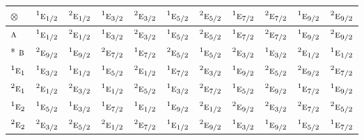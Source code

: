 \documentclass[10pt,a4paper]{article}
\numberwithin{equation}{section}
\newcommand{\irr}[1]{\text{\normalfont\scshape #1}}
\newcommand{\conjpair}[1]{{}^{#1}}
\newcommand{\irrprod}{\otimes}
\begin{document}
{\small\setlength{\tabcolsep}{3pt}\begin{longtable}{@{}lcccccccccc@{}}\toprule
$\irrprod$ & $\conjpair{1}\irr{e}_{1/2}$ & $\conjpair{2}\irr{e}_{1/2}$ & $\conjpair{1}\irr{e}_{3/2}$ & $\conjpair{2}\irr{e}_{3/2}$ & $\conjpair{1}\irr{e}_{5/2}$ & $\conjpair{2}\irr{e}_{5/2}$ & $\conjpair{1}\irr{e}_{7/2}$ & $\conjpair{2}\irr{e}_{7/2}$ & $\conjpair{1}\irr{e}_{9/2}$ & $\conjpair{2}\irr{e}_{9/2}$\\\midrule\endhead
\bottomrule\endfoot\endlastfoot
$\irr{a}$ & $\conjpair{1}\irr{e}_{1/2}$ & $\conjpair{2}\irr{e}_{1/2}$ & $\conjpair{1}\irr{e}_{3/2}$ & $\conjpair{2}\irr{e}_{3/2}$ & $\conjpair{1}\irr{e}_{5/2}$ & $\conjpair{2}\irr{e}_{5/2}$ & $\conjpair{1}\irr{e}_{7/2}$ & $\conjpair{2}\irr{e}_{7/2}$ & $\conjpair{1}\irr{e}_{9/2}$ & $\conjpair{2}\irr{e}_{9/2}$\\*
$\irr{b}$ & $\conjpair{2}\irr{e}_{9/2}$ & $\conjpair{1}\irr{e}_{9/2}$ & $\conjpair{2}\irr{e}_{7/2}$ & $\conjpair{1}\irr{e}_{7/2}$ & $\conjpair{2}\irr{e}_{5/2}$ & $\conjpair{1}\irr{e}_{5/2}$ & $\conjpair{2}\irr{e}_{3/2}$ & $\conjpair{1}\irr{e}_{3/2}$ & $\conjpair{2}\irr{e}_{1/2}$ & $\conjpair{1}\irr{e}_{1/2}$\\
$\conjpair{1}\irr{e}_{1}$ & $\conjpair{1}\irr{e}_{3/2}$ & $\conjpair{1}\irr{e}_{1/2}$ & $\conjpair{1}\irr{e}_{5/2}$ & $\conjpair{2}\irr{e}_{1/2}$ & $\conjpair{1}\irr{e}_{7/2}$ & $\conjpair{2}\irr{e}_{3/2}$ & $\conjpair{1}\irr{e}_{9/2}$ & $\conjpair{2}\irr{e}_{5/2}$ & $\conjpair{2}\irr{e}_{9/2}$ & $\conjpair{2}\irr{e}_{7/2}$\\
$\conjpair{2}\irr{e}_{1}$ & $\conjpair{2}\irr{e}_{1/2}$ & $\conjpair{2}\irr{e}_{3/2}$ & $\conjpair{1}\irr{e}_{1/2}$ & $\conjpair{2}\irr{e}_{5/2}$ & $\conjpair{1}\irr{e}_{3/2}$ & $\conjpair{2}\irr{e}_{7/2}$ & $\conjpair{1}\irr{e}_{5/2}$ & $\conjpair{2}\irr{e}_{9/2}$ & $\conjpair{1}\irr{e}_{7/2}$ & $\conjpair{1}\irr{e}_{9/2}$\\
$\conjpair{1}\irr{e}_{2}$ & $\conjpair{1}\irr{e}_{5/2}$ & $\conjpair{1}\irr{e}_{3/2}$ & $\conjpair{1}\irr{e}_{7/2}$ & $\conjpair{1}\irr{e}_{1/2}$ & $\conjpair{1}\irr{e}_{9/2}$ & $\conjpair{2}\irr{e}_{1/2}$ & $\conjpair{2}\irr{e}_{9/2}$ & $\conjpair{2}\irr{e}_{3/2}$ & $\conjpair{2}\irr{e}_{7/2}$ & $\conjpair{2}\irr{e}_{5/2}$\\
$\conjpair{2}\irr{e}_{2}$ & $\conjpair{2}\irr{e}_{3/2}$ & $\conjpair{2}\irr{e}_{5/2}$ & $\conjpair{2}\irr{e}_{1/2}$ & $\conjpair{2}\irr{e}_{7/2}$ & $\conjpair{1}\irr{e}_{1/2}$ & $\conjpair{2}\irr{e}_{9/2}$ & $\conjpair{1}\irr{e}_{3/2}$ & $\conjpair{1}\irr{e}_{9/2}$ & $\conjpair{1}\irr{e}_{5/2}$ & $\conjpair{1}\irr{e}_{7/2}$\\

\end{longtable}}
\end{document}
